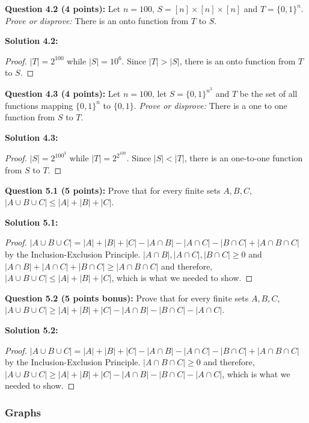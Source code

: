 \documentclass[11pt]{article}
\begin{document}
\textbf{Question 4.2 (4 points):} Let \(n=100\),
\(S = [n] \times [n] \times [n]\) and \(T=\{0,1\}^n\). \emph{Prove or
disprove:} There is an onto function from \(T\) to \(S\).

\textbf{Solution 4.2:}
\begin{proof}
  $|T| = 2^{100}$ while $|S| = 10^6$. Since $|T| > |S|$, there is an onto function
  from $T$ to $S$.
\end{proof}

\textbf{Question 4.3 (4 points):} Let \(n=100\), let
\(S = \{0,1\}^{n^3}\) and \(T\) be the set of all functions mapping
\(\{0,1\}^n\) to \(\{0,1\}\). \emph{Prove or disprove:} There is a one
to one function from \(S\) to \(T\).

\textbf{Solution 4.3:}
\begin{proof}
  $|S| = 2^{100^3}$ while $|T| = 2^{2^{100}}$. Since $|S| < |T|$, there is an 
  one-to-one function from $S$ to $T$.
\end{proof}

\newpage

\textbf{Question 5.1 (5 points):} Prove that for every finite sets
\(A,B,C\), \(|A \cup B \cup C| \leq |A|+|B|+|C|\).

\textbf{Solution 5.1:}
\begin{proof}
  $|A \cup B \cup C| = |A|+|B|+|C| - |A\cap B| - |A\cap C| - |B\cap C| + |A\cap B \cap C|$ 
  by the Inclusion-Exclusion Principle. $|A\cap B|, |A\cap C|, |B\cap C| \geq 0$
  and $|A\cap B| + |A\cap C| + |B\cap C| \geq  |A\cap B \cap C|$ and therefore, 
  $|A \cup B \cup C| \leq |A|+|B|+|C|$, which is what we needed to show.
\end{proof}

\textbf{Question 5.2 (5 points bonus):} Prove that for every finite sets
\(A,B,C\),
\(|A \cup B \cup C| \geq |A|+|B|+|C| - |A \cap B| - |B \cap C| - |A \cap C|\).

\textbf{Solution 5.2:}
\begin{proof}
  $|A \cup B \cup C| = |A|+|B|+|C| - |A\cap B| - |A\cap C| - |B\cap C| + |A\cap B \cap C|$ 
  by the Inclusion-Exclusion Principle. $|A\cap B \cap C| \geq 0$ and therefore, 
  $|A \cup B \cup C| \geq |A|+|B|+|C| - |A \cap B| - |B \cap C| - |A \cap C|$, which is what we needed to show.
\end{proof}

\newpage

\subsubsection{Graphs}\label{graphs}
\end{document}
